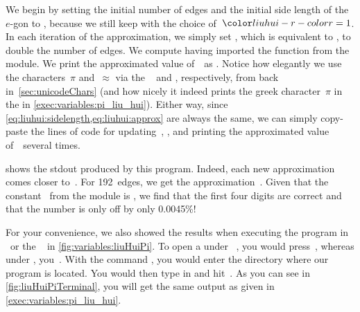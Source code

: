 We begin by setting the initial number of edges  and the initial side length of the $e$\nobreakdashes-gon to , because we still keep with the choice of~$\liuhuir=1$.
In each iteration of the approximation, we simply set \pythonIdx{*=}, which is equivalent to , to double the number of edges.
We compute  having imported the  function from the  module.
We print the approximated value of~\numberPi\ as .
Notice how elegantly we use the  characters~$\pi$ and~$\approx$ via the ~ and , respectively, from back in~\cref{sec:unicodeChars} (and how nicely it indeed prints the greek character~$\pi$ in the  in \cref{exec:variables:pi_liu_hui}).
Either way, since \cref{eq:liuhui:sidelength,eq:liuhui:approx} are always the same, we can simply copy-paste the lines of code for updating~, , and printing the approximated value of~\numberPi\ several times.

 shows the \acrfull{stdout} produced by this program.
Indeed, each new approximation comes closer to~\numberPi.
For 192~edges, we get the approximation~.
Given that the constant~ from the  module is , we find that the first four digits are correct and that the number is only off by only 0.0045\%!

For your convenience, we also showed the results when executing the program in \pycharm\ or the \ubuntu\  in \cref{fig:variables:liuHuiPi}.
To open a  under \ubuntu\ \linux, you would press~\ubuntuTerminal, whereas under \microsoftWindows, you~\windowsTerminal.
With the command , you would enter the directory where our program  is located.
You would then type in  and hit~\keys{\return}.
As you can see in \cref{fig:liuHuiPiTerminal}, you will get the same output as given in \cref{exec:variables:pi_liu_hui}.

